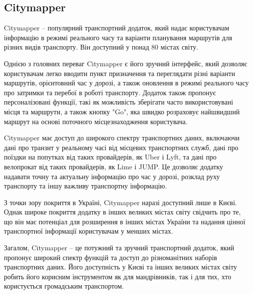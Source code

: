 \subsection{Citymapper}
\label{subsec:citymapper-subsection}

Citymapper -- популярний транспортний додаток, який надає користувачам інформацію в режимі реального часу та варіанти планування маршрутів для різних видів транспорту. Він доступний у понад 80 містах світу.

Однією з головних переваг Citymapper є його зручний інтерфейс, який дозволяє користувачам легко вводити пункт призначення та переглядати різні варіанти маршрутів, орієнтовний час у дорозі, а також оновлення в режимі реального часу про затримки та перебої в роботі транспорту. Додаток також пропонує персоналізовані функції, такі як можливість зберігати часто використовувані місця та маршрути, а також кнопку "Go", яка швидко розраховує найшвидший маршрут на основі поточного місцезнаходження користувача.

Citymapper має доступ до широкого спектру транспортних даних, включаючи дані про транзит у реальному часі від місцевих транспортних служб, дані про поїздки на попутках від таких провайдерів, як Uber і Lyft, та дані про велопрокат від таких провайдерів, як Lime і JUMP. Це дозволяє додатку надавати точну та актуальну інформацію про час у дорозі, розклад руху транспорту та іншу важливу транспортну інформацію.

З точки зору покриття в Україні, Citymapper наразі доступний лише в Києві. Однак широке покриття додатку в інших великих містах світу свідчить про те, що він має потенціал для розширення в інших містах України та надання цінної транспортної інформації користувачам у менших містах.

Загалом, Citymapper -- це потужний та зручний транспортний додаток, який пропонує широкий спектр функцій та доступ до різноманітних наборів транспортних даних. Його доступність у Києві та інших великих містах світу робить його корисним інструментом як для мандрівників, так і для тих, хто користується громадським транспортом.